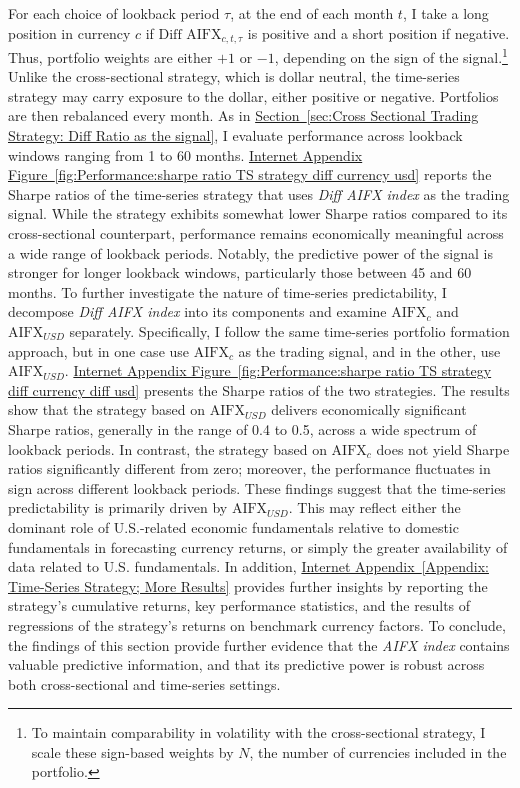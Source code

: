 \documentclass[12pt,oneside,letter]{article}
\newcommand*{\mysec}[1]{\hyperref[{#1}]{Section~\ref*{#1}}}
\newcommand*{\myfigIA}[1]{\hyperref[{#1}]{Internet Appendix Figure~\ref*{#1}}}
\newcommand*{\mysecIA}[1]{\hyperref[{#1}]{Internet Appendix~\ref*{#1}}}
\begin{document}
		For each choice of lookback period \(\tau\), at  the end of each month \(t\), I take a long position in currency \(c\) if \(\text{Diff AIFX}_{c,t,\tau}\) is positive and a short position if negative. Thus, portfolio weights are either \(+1\) or \(-1\), depending on the sign of the signal.\footnote{To maintain comparability in volatility with the cross-sectional strategy, I scale these sign-based weights by \(N\), the number of currencies included in the portfolio.} Unlike the cross-sectional strategy, which is dollar neutral, the time-series strategy may carry exposure to the dollar, either positive or negative. Portfolios are then rebalanced every month. As in \mysec{sec:Cross Sectional Trading Strategy: Diff Ratio as the signal}, I evaluate performance across lookback windows ranging from 1 to 60 months. \myfigIA{fig:Performance:sharpe ratio TS strategy diff currency usd} reports the Sharpe ratios of the time-series strategy that uses \textit{Diff AIFX index} as the trading signal. While the strategy exhibits somewhat lower Sharpe ratios compared to its cross-sectional counterpart, performance remains economically meaningful across a wide range of lookback periods. Notably, the predictive power of the signal is stronger for longer lookback windows, particularly those between 45 and 60 months. To further investigate the nature of time-series predictability, I decompose \textit{Diff AIFX index} into its components and examine \(\text{AIFX}_{c}\) and \(\text{AIFX}_{USD}\) separately. Specifically, I follow the same time-series portfolio formation approach, but in one case use \(\text{AIFX}_{c}\) as the trading signal, and in the other, use \(\text{AIFX}_{USD}\). \myfigIA{fig:Performance:sharpe ratio TS strategy diff currency diff usd} presents the Sharpe ratios of the two strategies. The results show that the strategy based on \(\text{AIFX}_{USD}\) delivers economically significant Sharpe ratios, generally in the range of 0.4 to 0.5, across a wide spectrum of lookback periods. In contrast, the strategy based on \(\text{AIFX}_{c}\) does not yield Sharpe ratios significantly different from zero; moreover, the performance fluctuates in sign across different lookback periods. These findings suggest that the time-series predictability is primarily driven by \(\text{AIFX}_{USD}\). This may reflect either the dominant role of U.S.-related economic fundamentals relative to domestic fundamentals in forecasting currency returns, or simply the greater availability of data related to U.S. fundamentals. In addition, \mysecIA{Appendix: Time-Series Strategy; More Results} provides further insights by reporting the strategy’s cumulative returns, key performance statistics, and the results of regressions of the strategy’s returns on benchmark currency factors. To conclude, the findings of this section provide further evidence that the \textit{AIFX index} contains valuable predictive information, and that its predictive power is robust across both cross-sectional and time-series settings.
\end{document}
